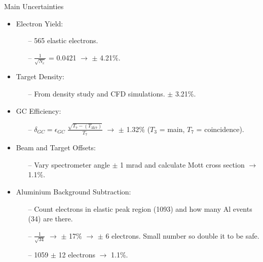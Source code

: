\documentclass[10pt]{beamer}
\begin{document}
\begin{frame}[fragile]{Main Uncertainties}

	\begin{itemize}
		\pause
		\item \alert{Electron Yield}:
			\begin{itemize}
				\item[--] 565 elastic electrons.
				\item[--] $\frac{1}{\sqrt{N_e}}$ = 0.0421 $\rightarrow$ $\pm$ 4.21$\%$.
			\end{itemize}
		\pause
		\item \alert{Target Density}:
			\begin{itemize}
				\item[--] From density study and CFD simulations. $\pm$ 3.21$\%$.
			\end{itemize}
		\pause
		\item \alert{GC Efficiency}:
			\begin{itemize}
				\item[--] $\delta_{GC} = \epsilon_{GC} \; \frac{\sqrt{T_7-(T_{3\&7})}}{T_7}$ $\rightarrow$ $\pm$ 1.32$\%$ ($T_3$ = main, $T_7$ = coincidence).
			\end{itemize}
		\pause
		\item \alert{Beam and Target Offsets}:
			\begin{itemize}
				\item[--] Vary spectrometer angle $\pm$ 1 mrad and calculate Mott cross section $\rightarrow$ 1.1$\%$.
			\end{itemize}
		\pause
		\item \alert{Aluminium Background Subtraction}:
			\begin{itemize}
				\item[--] Count electrons in elastic peak region (1093) and how many Al events (34) are there.
				\item[--] $\frac{1}{\sqrt{34}}$ $\rightarrow$ $\pm$ 17$\%$ $\rightarrow$ $\pm$ 6 electrons. Small number so double it to be safe.
				\item[--] 1059 $\pm$ 12 electrons $\rightarrow$ 1.1$\%$.
			\end{itemize}
	\end{itemize}
	
\end{frame}
\end{document}

